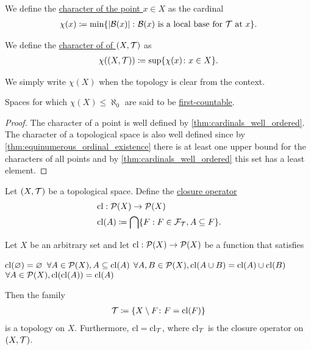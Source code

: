 \begin{definition}\label{def:topological_space_character}
  We define the \ul{character of the point $x \in X$} as the cardinal
  \begin{align*}
    \chi(x) \coloneqq \min \{ \left\vert \mathcal B(x) \right\vert \colon \mathcal B(x) \text{ is a local base for } \mathcal T \text{ at } x \}.
  \end{align*}

  We define the \ul{character of of $(X, \mathcal T)$} as
  \begin{align*}
    \chi((X, \mathcal T)) \coloneqq \sup \{ \chi(x) \colon x \in X \}.
  \end{align*}

  We simply write $\chi(X)$ when the topology is clear from the context.

  Spaces for which $\chi(X) \leq \aleph_0$ are said to be \ul{first-countable}.
\end{definition}
\begin{proof}
  The character of a point is well defined by \cref{thm:cardinals_well_ordered}. The character of a topological space is also well defined since by \cref{thm:equinumerous_ordinal_existence} there is at least one upper bound for the characters of all points and by \cref{thm:cardinals_well_ordered} this set has a least element.
\end{proof}

\begin{definition}\label{def:closure_operator}\cite[33]{Engelking1989}
  Let $(X, \mathcal T)$ be a topological space. Define the \ul{closure operator}
  \begin{align*}
    &\operatorname{cl}: \operatorname{\mathcal P}(X) \to \operatorname{\mathcal P}(X) \\
    &\operatorname{cl}(A) \coloneqq \bigcap \{ F : F \in \mathcal F_{\mathcal T}, A \subseteq F \}.
  \end{align*}
\end{definition}

\begin{proposition}\label{thm:closure_operator_axioms}\cite[14]{Engelking1989}
  Let $X$ be an arbitrary set and let $\operatorname{cl}: \operatorname{\mathcal P}(X) \to \operatorname{\mathcal P}(X)$ be a function that satisfies
  \begin{description}
     $\operatorname{cl}(\varnothing) = \varnothing$
     $\forall A \in \operatorname{\mathcal P}(X), A \subseteq \operatorname{cl}(A)$
     $\forall A, B \in \operatorname{\mathcal P}(X), \operatorname{cl}(A \cup B) = \operatorname{cl}(A) \cup \operatorname{cl}(B)$
     $\forall A \in \operatorname{\mathcal P}(X), \operatorname{cl}(\operatorname{cl}(A)) = \operatorname{cl}(A)$
  \end{description}

  Then the family
  \begin{align*}
    \mathcal T \coloneqq \{ X \setminus F \colon F = \operatorname{cl}(F) \}
  \end{align*}
  is a topology on $X$. Furthermore, $\operatorname{cl} = \operatorname{cl}_{\mathcal T}$, where $\operatorname{cl}_{\mathcal T}$ is the closure operator on $(X, \mathcal T)$.
\end{proposition}

